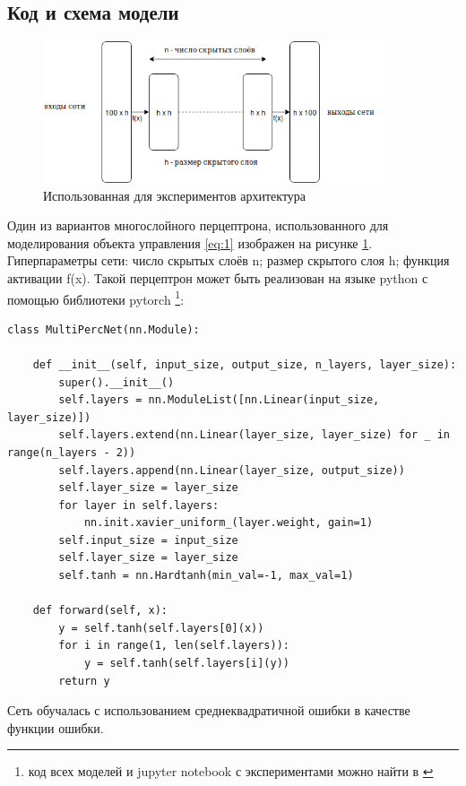 \documentclass[12pt, oneside]{extbook}
\begin{document}
\begin{flushleft}
\section{Код и схема модели}
\begin{figure}[h]
\centering
\includegraphics[width=0.9\textwidth]{multi_layer_perceptron}
\caption{Использованная для экспериментов архитектура}
\label{fig:my_multi_perceptron}
\end{figure}
Один из вариантов многослойного перцептрона, использованного для моделирования объекта управления \ref{eq:1} изображен на рисунке \ref{fig:my_multi_perceptron}. Гиперпараметры сети: число скрытых слоёв n; размер скрытого слоя h; функция активации f(x). Такой перцептрон может быть реализован на языке python с помощью библиотеки pytorch \footnote{код всех моделей и jupyter notebook с экспериментами можно найти в \cite{source_code}}:
\begin{verbatim}
class MultiPercNet(nn.Module):

    def __init__(self, input_size, output_size, n_layers, layer_size):
        super().__init__()
        self.layers = nn.ModuleList([nn.Linear(input_size, layer_size)])
        self.layers.extend(nn.Linear(layer_size, layer_size) for _ in range(n_layers - 2))
        self.layers.append(nn.Linear(layer_size, output_size))
        self.layer_size = layer_size
        for layer in self.layers:
            nn.init.xavier_uniform_(layer.weight, gain=1)
        self.input_size = input_size
        self.layer_size = layer_size
        self.tanh = nn.Hardtanh(min_val=-1, max_val=1)

    def forward(self, x):
        y = self.tanh(self.layers[0](x))
        for i in range(1, len(self.layers)):
            y = self.tanh(self.layers[i](y))
        return y
\end{verbatim}
\par
Сеть обучалась с использованием среднеквадратичной ошибки в качестве функции ошибки.
\pagebreak

\end{flushleft}
\end{document}
